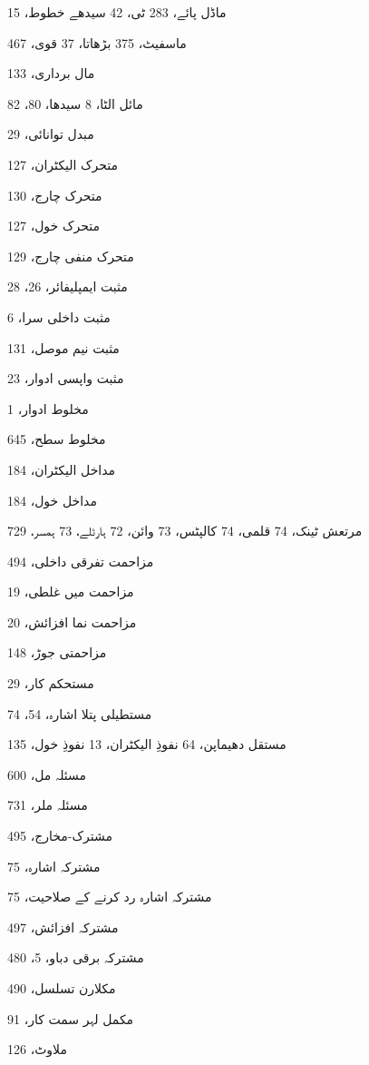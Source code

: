 \begin{theindex}
\item ماڈل 
     \subitem پائے، 283 
     \subitem ٹی، 42 
     \subitem سیدھے خطوط، 15
\item ماسفیٹ، 375 
     \subitem بڑھاتا، 37 
     \subitem قوی، 467
\item مال برداری، 133
\item مائل 
     \subitem الٹا، 8 
     \subitem سیدھا، 80، 82
\item مبدل توانائی، 29
\item متحرک الیکٹران، 127
\item متحرک چارج، 130
\item متحرک خول، 127
\item متحرک منفی چارج، 129
\item مثبت ایمپلیفائر، 26، 28
\item مثبت داخلی سرا، 6
\item مثبت نیم موصل، 131
\item مثبت واپسی ادوار، 23
\item مخلوط ادوار، 1
\item مخلوط سطح، 645
\item مداخل الیکٹران، 184
\item مداخل خول، 184
\item مرتعش 
     \subitem ٹینک، 74 
     \subitem قلمی، 74 
     \subitem کالپٹس، 73 
     \subitem وائن، 72 
     \subitem ہارٹلے، 73 
     \subitem ہمسر، 729
\item مزاحمت 
     \subitem تفرقی داخلی، 494
\item مزاحمت میں غلطی، 19
\item مزاحمت نما افزائش، 20
\item مزاحمتی جوڑ، 148
\item مستحکم کار، 29
\item مستطیلی پتلا اشارہ، 54، 74
\item مستقل 
     \subitem دھیماپن، 64 
     \subitem نفوذِ الیکٹران، 13 
     \subitem نفوذِ خول، 135
\item مسئلہ مل، 600
\item مسئلہ ملر، 731
\item مشترک-مخارج، 495
\item مشترکہ اشارہ، 75
\item مشترکہ اشارہ رد کرنے کے صلاحیت، 75
\item مشترکہ افزائش، 497
\item مشترکہ برقی دباو، 5، 480
\item مکلارن تسلسل، 490
\item مکمل لہر سمت کار، 91
\item ملاوٹ، 126

\end{theindex}
